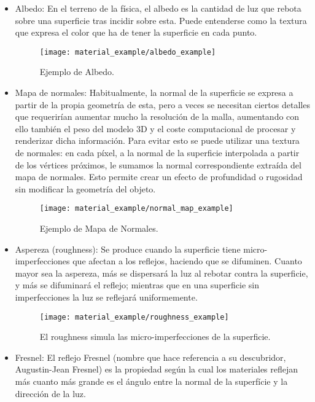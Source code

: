 \begin{itemize}
    \item Albedo: En el terreno de la física, el albedo es la cantidad de luz que rebota sobre una superficie tras incidir sobre esta\cite{def_albedo}. Puede entenderse como la textura que expresa el color que ha de tener la superficie en cada punto.
    \begin{figure}[H]
        \centering
        \texttt{[image: material\_example/albedo\_example]}
        \caption{Ejemplo de Albedo\cite{free_pbr}.}
        \label{fig:albedo_ex}
    \end{figure}
    \item Mapa de normales: Habitualmente, la normal de la superficie se expresa a partir de la propia geometría de esta, pero a veces se necesitan ciertos detalles que requerirían aumentar mucho la resolución de la malla, aumentando con ello también el peso del modelo 3D y el coste computacional de procesar y renderizar dicha información. Para evitar esto se puede utilizar una textura de normales: en cada píxel, a la normal de la superficie interpolada a partir de los vértices próximos, le sumamos la normal correspondiente extraída del mapa de normales. Esto permite crear un efecto de profundidad o rugosidad sin modificar la geometría del objeto.
    \begin{figure}[H]
        \centering
        \texttt{[image: material\_example/normal\_map\_example]}
        \caption{Ejemplo de Mapa de Normales\cite{free_pbr}.}
        \label{fig:normal_map_ex}
    \end{figure}
    \item Aspereza (roughness): Se produce cuando la superficie tiene micro-imperfecciones que afectan a los reflejos, haciendo que se difuminen. Cuanto mayor sea la aspereza, más se dispersará la luz al rebotar contra la superficie, y más se difuminará el reflejo; mientras que en una superficie sin imperfecciones la luz se reflejará uniformemente.
    \begin{figure}[H]
        \centering
        \texttt{[image: material\_example/roughness\_example]}
        \caption{El roughness simula las micro-imperfecciones de la superficie.}
        \label{fig:roughness_ex}
    \end{figure}
    \item Fresnel: El reflejo Fresnel (nombre que hace referencia a su descubridor, Augustin-Jean Fresnel) es la propiedad según la cual los materiales reflejan más cuanto más grande es el ángulo entre la normal de la superfície y la dirección de la luz.

\end{itemize}
